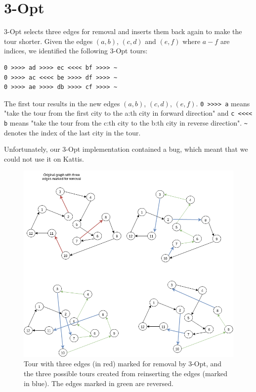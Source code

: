 \documentclass{report}
\begin{document}
\section{3-Opt}
3-Opt selects three edges for removal and inserts them back again to make the tour shorter. Given the edges $(a, b)$, $(c, d)$ and $(e,f)$ where $a-f$ are indices, we identified the following 3-Opt tours: 

\begin{verbatim}
0 >>>> ad >>>> ec <<<< bf >>>> ~
0 >>>> ac <<<< be >>>> df >>>> ~
0 >>>> ae >>>> db >>>> cf >>>> ~
\end{verbatim}

The first tour results in the new edges $(a,b)$, $(c, d)$, $(e,f)$. \verb!0 >>>> a! means "take the tour from the first city to the a:th city in forward direction" and \verb!c <<<< b! means "take the tour from the c:th city to the b:th city in reverse direction". \verb!~! denotes the index of the last city in the tour.

Unfortunately, our 3-Opt implementation contained a bug, which meant that we could not use it on Kattis.

\begin{figure}[ht]
\centering
\includegraphics[angle=90,origin=c,width=140mm]{3-Opt}
\caption{Tour with three edges (in red) marked for removal by 3-Opt, and the three possible tours created from reinserting the edges (marked in blue). The edges marked in green are reversed.}
\end{figure}
\end{document}

